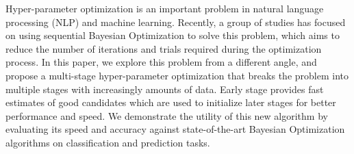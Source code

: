 Hyper-parameter optimization is an important problem in natural language processing (NLP) and machine learning. Recently, a group of studies has focused on using sequential Bayesian Optimization to solve this problem, which aims to reduce the number of iterations and trials required during the optimization process. In this paper, we explore this problem from a different angle, and propose a multi-stage hyper-parameter optimization that breaks the problem into multiple stages with increasingly amounts of data. Early stage provides fast estimates of good candidates which are used to initialize later stages for better performance and speed. We demonstrate the utility of this new algorithm by evaluating its speed and accuracy against state-of-the-art Bayesian Optimization algorithms on classification and prediction tasks.
